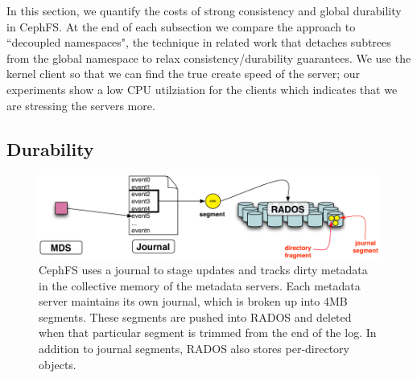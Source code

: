 In this section, we quantify the costs of strong consistency and global
durability in CephFS. At the end of each subsection we compare the approach to
``decoupled namespaces", the technique in related work that detaches subtrees
from the global namespace to relax consistency/durability guarantees.  We use
the kernel client so that we can find the true create speed of the server; our
experiments show a low CPU utilziation for the clients which indicates that we
are stressing the servers more. 

\subsection{Durability}
\label{sec:durability}

\begin{figure}[tb] \centering
\includegraphics[width=1\linewidth]{./figures/journal.png} 
\caption{CephFS uses a journal to stage updates and tracks dirty metadata in
the collective memory of the metadata servers. Each metadata server maintains its own journal, which is
broken up into 4MB segments. These segments are pushed into RADOS and deleted
when that particular segment is trimmed from the end of the log. In addition to
journal segments, RADOS also stores per-directory objects. \label{fig:journal}}
\end{figure}
